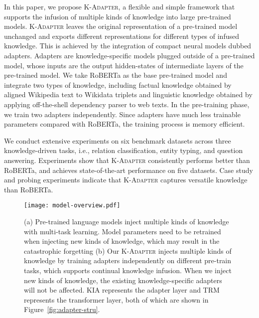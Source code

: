\documentclass[11pt,a4paper]{article}
\begin{document}
In this paper, we propose \textsc{K-Adapter}, a flexible and simple framework that supports the infusion of multiple kinds of knowledge into large pre-trained models.
\textsc{K-Adapter} 
leaves the original representation of a pre-trained model unchanged and exports different representations for different types of infused knowledge. This is achieved by the integration of compact neural models dubbed adapters. Adapters are knowledge-specific models plugged outside of a pre-trained model, whose inputs are the output hidden-states of intermediate layers of the pre-trained model. 
We take RoBERTa \citep{liu2019roberta} as the base pre-trained model and integrate two types of knowledge, including factual knowledge obtained by aligned Wikipedia text to Wikidata triplets and linguistic knowledge obtained by applying off-the-shell dependency parser to web texts.
In the pre-training phase, we train two adapters independently.
Since adapters have much less trainable parameters compared with RoBERTa, the training process is memory efficient.

We conduct extensive experiments on six benchmark datasets across three knowledge-driven tasks, i.e., relation classification, entity typing, and question answering. Experiments show that \textsc{K-Adapter} consistently performs better than RoBERTa, and achieves state-of-the-art performance on five datasets.
Case study and 
probing experiments 
indicate that \textsc{K-Adapter} captures versatile knowledge than RoBERTa.





\begin{figure*}[!ht]
    \centering
    \texttt{[image: model-overview.pdf]}
    \vspace{-2mm}
    \caption{(a) Pre-trained language models inject multiple kinds of knowledge with multi-task learning. Model parameters need to be retrained when injecting new kinds of knowledge, which may result in the catastrophic forgetting (b) Our \textsc{K-Adapter} injects multiple kinds of knowledge by training adapters independently on different pre-train tasks, which supports continual knowledge infusion. When we inject new kinds of knowledge, the existing knowledge-specific adapters will not be affected. KIA represents the adapter layer and TRM represents the transformer layer, both of which are shown in  Figure~\ref{fig:adapter-stru}.}
    \label{fig:overview}
    \vspace{-3mm}
\end{figure*}
\end{document}
